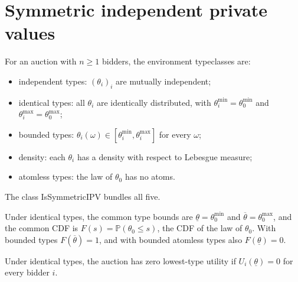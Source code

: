 \section{Symmetric independent private values}

\begin{definition}\label{def:MathEconLib.Auction.IsSymmetricIPV}\leanok
{}
For an auction with $n\ge1$ bidders, the environment typeclasses are:
\begin{itemize}
\item independent types: $(\theta_i)_i$ are mutually independent;
\item identical types: all $\theta_i$ are identically distributed, with $\theta^{\min}_i=\theta^{\min}_0$ and $\theta^{\max}_i=\theta^{\max}_0$;
\item bounded types: $\theta_i(\omega)\in[\theta^{\min}_i,\theta^{\max}_i]$ for every $\omega$;
\item density: each $\theta_i$ has a density with respect to Lebesgue measure;
\item atomless types: the law of $\theta_0$ has no atoms.
\end{itemize}
The class IsSymmetricIPV bundles all five.
\end{definition}

\begin{definition}\label{def:MathEconLib.Auction.commonCDF}\leanok
{}
Under identical types, the common type bounds are $\underline\theta=\theta^{\min}_0$ and $\overline\theta=\theta^{\max}_0$, and the common CDF is $F(s)=\mathbb{P}(\theta_0\le s)$, the CDF of the law of $\theta_0$. With bounded types $F(\overline\theta)=1$, and with bounded atomless types also $F(\underline\theta)=0$.
\end{definition}

\begin{definition}\label{def:MathEconLib.Auction.HasZeroLowestTypeUtility}\leanok
{}
Under identical types, the auction has zero lowest-type utility if $U_i(\underline\theta)=0$ for every bidder $i$.
\end{definition}


